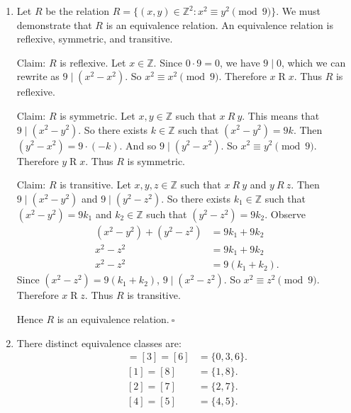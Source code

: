 \documentclass{article}
\newcommand{\Z}{\mathbb{Z}}
\theoremstyle{definition}
\begin{document}
\begin{solution}
\begin{enumerate}
\item
Let $R$ be the relation $R=\{(x,y)\in\Z^2:x^2\equiv y^2\pmod{9}\}$. We must demonstrate that $R$ is an equivalence relation. An equivalence relation is reflexive, symmetric, and transitive.
\newline

\noindent Claim: $R$ is reflexive. Let $x\in\Z$. Since $0\cdot 9=0$, we have $9\mid 0$, which we can rewrite as $9\mid(x^2-x^2)$. So $x^2\equiv x^2\pmod{9}$. Therefore $x\mathrel{R}x$. Thus $R$ is reflexive.
\newline

\noindent Claim: $R$ is symmetric. Let $x,y\in\Z$ such that $x~R~y$. This means that $9\mid(x^2-y^2)$. So there exists $k\in\Z$ such that $(x^2-y^2)=9k$. Then $(y^2-x^2)=9\cdot(-k)$. And so $9\mid(y^2-x^2)$. So $x^2\equiv y^2\pmod{9}$. Therefore $y\mathrel{R}x$. Thus $R$ is symmetric. 
\newline

\noindent Claim: $R$ is transitive. Let $x,y,z\in\Z$ such that $x~R~y$ and $y~R~z$. Then $9\mid(x^2-y^2)$ and $9\mid(y^2-z^2)$. So there exists $k_1\in\Z$ such that $(x^2-y^2)=9k_1$ and $k_2\in\Z$ such that $(y^2-z^2)=9k_2$. Observe
\begin{align*}
(x^2-y^2)+(y^2-z^2)&=9k_1+9k_2\\
x^2-z^2&=9k_1+9k_2\\
x^2-z^2&=9(k_1+k_2).
\end{align*}
Since $(x^2-z^2)=9(k_1+k_2)$, $9\mid(x^2-z^2)$. So $x^2\equiv z^2\pmod{9}$. Therefore $x\mathrel{R}z$. Thus $R$ is transitive.
\newline

\noindent Hence $R$ is an equivalence relation.$~\square$
\item There distinct equivalence classes are:
\begin{align*}
[0]=[3]=[6]&=\{0,3,6\}.\\
[1]=[8]&=\{1,8\}.\\
[2]=[7]&=\{2,7\}.\\
[4]=[5]&=\{4,5\}.
\end{align*}
\end{enumerate}
\end{solution}
\end{document}
